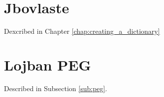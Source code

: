 \chapter{Jbovlaste}
\label{appendix:jbovlaste-annex}

Dexcribed in Chapter \ref{chap:creating_a_dictionary}



\chapter{Lojban PEG}
\label{appendix:peg-annex}

Described in Subsection \ref{sub:peg}.

